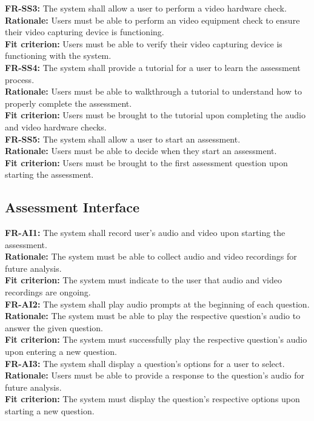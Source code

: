 \documentclass[12pt]{article}
\begin{document}
\textbf{FR-SS3: } The system shall allow a user to perform a video hardware check.\\
\textbf{Rationale: } Users must be able to perform an video equipment check to ensure their video capturing device is functioning.\\
\textbf{Fit criterion: } Users must be able to verify their video capturing device is functioning with the system.\\

\textbf{FR-SS4: } The system shall provide a tutorial for a user to learn the assessment process.\\
\textbf{Rationale: } Users must be able to walkthrough a tutorial to understand how to properly complete the assessment.\\
\textbf{Fit criterion: } Users must be brought to the tutorial upon completing the audio and video hardware checks.\\

\textbf{FR-SS5: } The system shall allow a user to start an assessment.\\
\textbf{Rationale: } Users must be able to decide when they start an assessment.\\
\textbf{Fit criterion: } Users must be brought to the first assessment question upon starting the assessment.\\

\subsection{Assessment Interface}
\textbf{FR-AI1: } The system shall record user's audio and video upon starting the assessment.\\
\textbf{Rationale: } The system must be able to collect audio and video recordings for future analysis.\\
\textbf{Fit criterion: } The system must indicate to the user that audio and video recordings are ongoing.\\

\textbf{FR-AI2: } The system shall play audio prompts at the beginning of each question.\\
\textbf{Rationale: } The system must be able to play the respective question's audio to answer the given question.\\
\textbf{Fit criterion: } The system must successfully play the respective question's audio upon entering a new question.\\

\textbf{FR-AI3: } The system shall display a question's options for a user to select.\\
\textbf{Rationale: } Users must be able to provide a response to the question's audio for future analysis.\\
\textbf{Fit criterion: } The system must display the question's respective options upon starting a new question.\\
\end{document}
